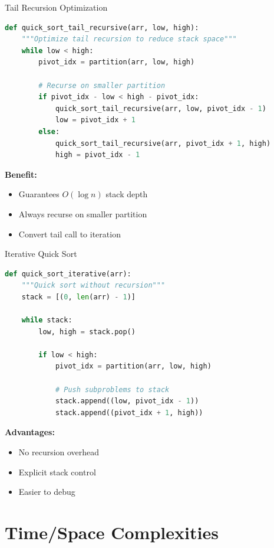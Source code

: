 \documentclass[aspectratio=169]{beamer}
\begin{document}
\begin{frame}[fragile]{Tail Recursion Optimization}
\begin{lstlisting}[language=Python, basicstyle=\ttfamily\tiny]
def quick_sort_tail_recursive(arr, low, high):
    """Optimize tail recursion to reduce stack space"""
    while low < high:
        pivot_idx = partition(arr, low, high)

        # Recurse on smaller partition
        if pivot_idx - low < high - pivot_idx:
            quick_sort_tail_recursive(arr, low, pivot_idx - 1)
            low = pivot_idx + 1
        else:
            quick_sort_tail_recursive(arr, pivot_idx + 1, high)
            high = pivot_idx - 1
\end{lstlisting}

\vspace{0.3cm}
\textbf{Benefit:}
\begin{itemize}
  \item Guarantees $O(\log n)$ stack depth
  \item Always recurse on smaller partition
  \item Convert tail call to iteration
\end{itemize}
\end{frame}

\begin{frame}[fragile]{Iterative Quick Sort}
\begin{lstlisting}[language=Python, basicstyle=\ttfamily\tiny]
def quick_sort_iterative(arr):
    """Quick sort without recursion"""
    stack = [(0, len(arr) - 1)]

    while stack:
        low, high = stack.pop()

        if low < high:
            pivot_idx = partition(arr, low, high)

            # Push subproblems to stack
            stack.append((low, pivot_idx - 1))
            stack.append((pivot_idx + 1, high))
\end{lstlisting}

\vspace{0.3cm}
\textbf{Advantages:}
\begin{itemize}
  \item No recursion overhead
  \item Explicit stack control
  \item Easier to debug
\end{itemize}
\end{frame}

\section{Time/Space Complexities}
\end{document}
